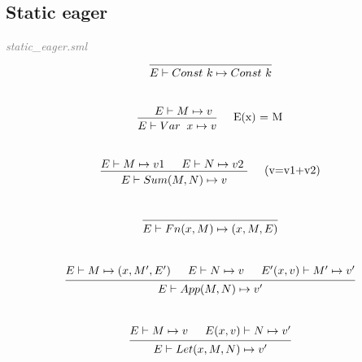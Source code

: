 \documentclass[a4paper]{article}
\begin{document}
	\subsection{Static eager}
	\textit{\textcolor{gray}{static\_eager.sml}} \\
	\[
		\begin{prooftree}
			\hypo{}
			\infer1[]{E \vdash Const \ k \mapsto Const \ k}
		\end{prooftree}
	\]
	\\
	\[
		\begin{prooftree}
			\hypo{E \vdash M \mapsto v }
			\infer1[\quad E(x) = M]{E \vdash Var &x \mapsto v}
		\end{prooftree}
	\]
	\\
	\[
		\begin{prooftree}
			\hypo{E \vdash M \mapsto v1}
			\hypo{E \vdash N \mapsto v2 }
			\infer2[\quad (v=v1+v2)]{E \vdash Sum(M, N) \mapsto v}
		\end{prooftree}
	\]
	\\
	\[
		\begin{prooftree}
			\hypo{}
			\infer1[]{E \vdash Fn(x, M) \mapsto (x, M, E)}
		\end{prooftree}
	\]
	\\
	\[
		\begin{prooftree}
			\hypo{E \vdash M \mapsto (x, M', E')}
			\hypo{E \vdash N \mapsto v}
			\hypo{E'(x, v) \vdash M' \mapsto v'}
			\infer3[]{E \vdash App(M, N) \mapsto v'}
		\end{prooftree}
	\]
	\\
	\[
		\begin{prooftree}
			\hypo{E \vdash M \mapsto v}
			\hypo{E(x, v) \vdash N \mapsto v'}
			\infer2[]{E \vdash Let(x, M, N) \mapsto v' }
		\end{prooftree}
	\]
\end{document}
